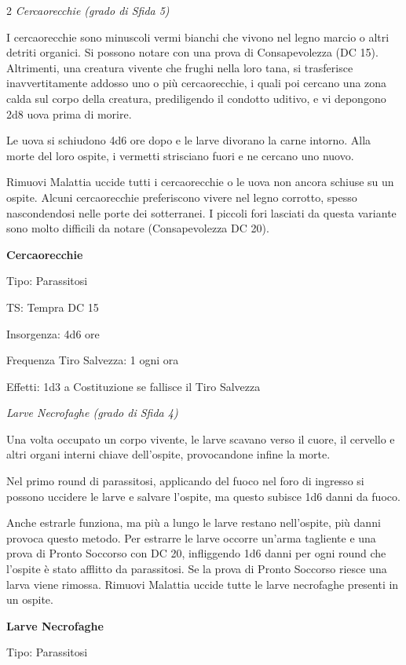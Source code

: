 \begin{multicols}{2}
\medskip
\noindent\emph{Cercaorecchie (grado di Sfida 5)}

I cercaorecchie sono minuscoli vermi bianchi che vivono nel legno marcio o altri detriti organici. Si possono notare con una prova di Consapevolezza (DC 15). Altrimenti, una creatura vivente che frughi nella loro tana, si trasferisce inavvertitamente addosso uno o più cercaorecchie, i quali poi cercano una zona calda sul corpo della creatura, prediligendo il condotto uditivo, e vi depongono 2d8 uova prima di morire.

Le uova si schiudono 4d6 ore dopo e le larve divorano la carne intorno. Alla morte del loro ospite, i vermetti strisciano fuori e ne cercano uno nuovo.

Rimuovi Malattia uccide tutti i cercaorecchie o le uova non ancora schiuse su un ospite. Alcuni cercaorecchie preferiscono vivere nel legno corrotto, spesso nascondendosi nelle porte dei sotterranei. I piccoli fori lasciati da questa variante sono molto difficili da notare (Consapevolezza DC 20).

\medskip
\textbf{Cercaorecchie}

Tipo: Parassitosi

TS: Tempra DC 15

Insorgenza: 4d6 ore

Frequenza Tiro Salvezza: 1 ogni ora

Effetti: 1d3 a Costituzione se fallisce il Tiro Salvezza

\medskip
\noindent\emph{Larve Necrofaghe (grado di Sfida 4)}

Una volta occupato un corpo vivente, le larve scavano verso il cuore, il cervello e altri organi interni chiave dell'ospite, provocandone infine la morte.

Nel primo round di parassitosi, applicando del fuoco nel foro di ingresso si possono uccidere le larve e salvare l'ospite, ma questo subisce 1d6 danni da fuoco.

Anche estrarle funziona, ma più a lungo le larve restano nell'ospite, più danni provoca questo metodo. Per estrarre le larve occorre un'arma tagliente e una prova di Pronto Soccorso con DC 20, infliggendo 1d6 danni per ogni round che l'ospite è stato afflitto da parassitosi. Se la prova di Pronto Soccorso riesce una larva viene rimossa. Rimuovi Malattia uccide tutte le larve necrofaghe presenti in un ospite.

\medskip
\textbf{Larve Necrofaghe}

Tipo: Parassitosi


\end{multicols}
